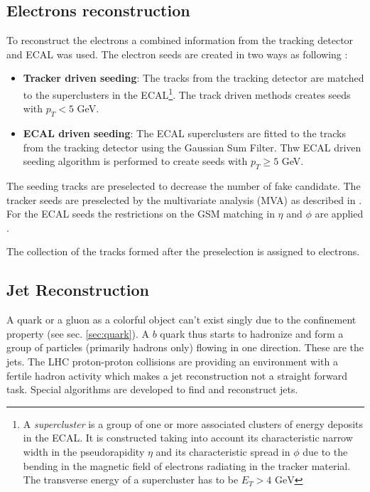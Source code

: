 \subsection{Electrons reconstruction}\label{ssec:ElRec}

To reconstruct the electrons a combined information from the tracking detector and ECAL was used. The electron seeds
are created in two ways as following \cite{CMS-PAS-EGM-10-004}:

\begin{itemize}
 \item \textbf{Tracker driven seeding}: The tracks from the tracking detector are matched to the superclusters in the ECAL\footnote
 {A \textit{supercluster} is  a group of one or more associated clusters of energy deposits in the ECAL. It is constructed taking into 
 account its characteristic narrow width in the pseudorapidity $\eta$ and its characteristic spread in $\phi$ due to the bending in the 
 magnetic field of electrons radiating in the tracker material. The transverse energy of a supercluster has to be $E_{T} > \textrm{4 GeV}$}.
 The track driven methods creates seeds with $p_{T} < 5$ GeV.
 
 \item \textbf{ECAL driven seeding}: The ECAL superclusters are fitted to the tracks from the tracking detector using the Gaussian Sum Filter\cite{GSF_Electron_Reconstruction_CMS}.
 Thw ECAL driven seeding algorithm is performed to create seeds with $p_{T} \geq 5$ GeV.
\end{itemize}

The seeding tracks are preselected to decrease the number of fake candidate. The tracker seeds are preselected by the multivariate analysis 
(MVA) as described in \cite{CMS:2010byl}. For the ECAL seeds the restrictions on the GSM matching in $\eta$ and $\phi$ are applied \cite{Baffioni:2006cd}.

The collection of the tracks formed after the preselection is assigned to electrons.

\subsection{Jet Reconstruction}

A quark or a gluon as a colorful object can't exist singly due to the confinement property (see sec. \ref{sec:quark}).
A $b$ quark thus starts to hadronize and form a group of particles (primarily hadrons only) flowing in one direction. These are the jets. The LHC proton-proton collisions
are providing an environment with a fertile hadron activity which makes a jet reconstruction not a straight forward task. Special algorithms are developed
to find and reconstruct jets.

